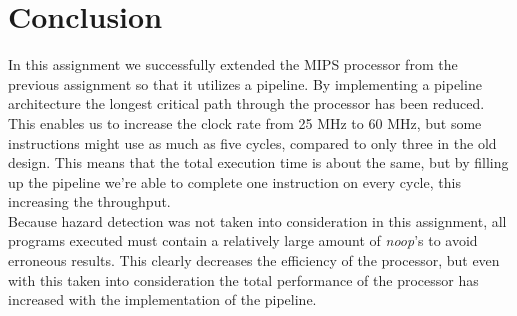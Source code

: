 \section{Conclusion}
In this assignment we successfully extended the MIPS processor from the previous assignment so that it utilizes a pipeline. By implementing a pipeline architecture the longest critical path through the processor has been reduced. This enables us to increase the clock rate from 25 MHz to 60 MHz, but some instructions might use as much as five cycles, compared to only three in the old design. This means that the total execution time is about the same, but by filling up the pipeline we're able to complete one instruction on every cycle, this increasing the throughput.\\

Because hazard detection was not taken into consideration in this assignment, all programs executed must contain a relatively large amount of \emph{noop}'s to avoid erroneous results. This clearly decreases the efficiency of the processor, but even with this taken into consideration the total performance of the processor has increased with the implementation of the pipeline.\\
